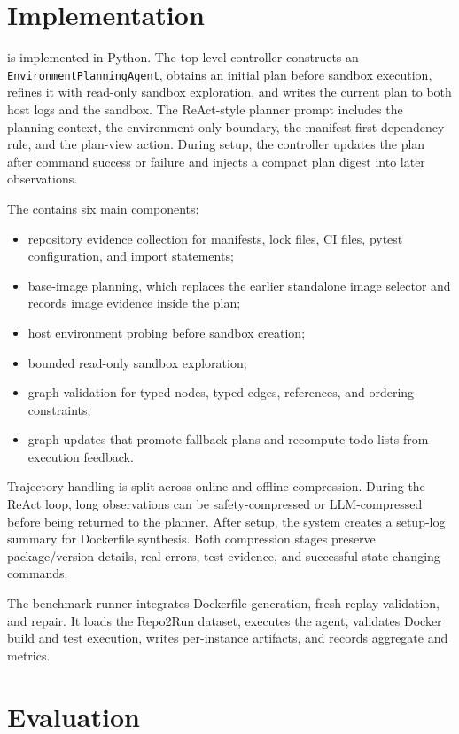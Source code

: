 \section{Implementation}

\tool is implemented in Python.
The top-level controller constructs an \texttt{EnvironmentPlanningAgent}, obtains an initial plan before sandbox execution, refines it with read-only sandbox exploration, and writes the current plan to both host logs and the sandbox.
The ReAct-style planner prompt includes the planning context, the environment-only boundary, the manifest-first dependency rule, and the plan-view action.
During setup, the controller updates the plan after command success or failure and injects a compact plan digest into later observations.

The \planner contains six main components:
\begin{itemize}[leftmargin=*]
  \item repository evidence collection for manifests, lock files, CI files, pytest configuration, and import statements;
  \item base-image planning, which replaces the earlier standalone image selector and records image evidence inside the plan;
  \item host environment probing before sandbox creation;
  \item bounded read-only sandbox exploration;
  \item graph validation for typed nodes, typed edges, references, and ordering constraints;
  \item graph updates that promote fallback plans and recompute todo-lists from execution feedback.
\end{itemize}

Trajectory handling is split across online and offline compression.
During the ReAct loop, long observations can be safety-compressed or LLM-compressed before being returned to the planner.
After setup, the system creates a setup-log summary for Dockerfile synthesis.
Both compression stages preserve package/version details, real errors, test evidence, and successful state-changing commands.

The benchmark runner integrates Dockerfile generation, fresh replay validation, and repair.
It loads the Repo2Run dataset, executes the agent, validates Docker build and test execution, writes per-instance artifacts, and records aggregate \dgsr and \ebsr metrics.

\section{Evaluation}

